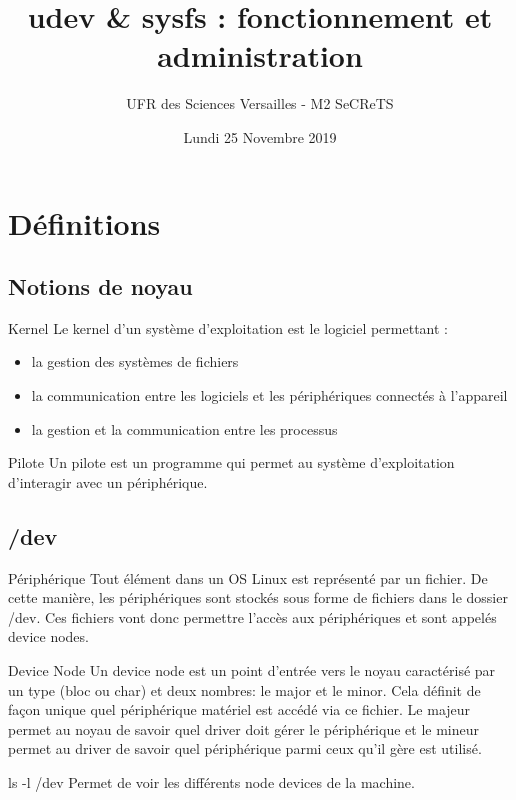 \documentclass{beamer}
\title{udev \& sysfs : fonctionnement et administration}
\author{UFR des Sciences Versailles - M2 SeCReTS}
\institute{CAUMES Clément \& DEBROUASSE Kevin \& \\ HEQUET Jonathan \& Mehdi MTALSI-MERIMI}
\date{Lundi 25 Novembre 2019}
\begin{document}
  \begin{frame}
  \titlepage
  \end{frame}

\section{Définitions}

\subsection{Notions de noyau}

 \begin{frame}
	\begin{block}{Kernel} 
	Le kernel d'un système d'exploitation est le logiciel permettant : 
	\begin{itemize}
		[circle]
		\item la gestion des systèmes de fichiers
		\item la communication entre les logiciels et les périphériques connectés à l'appareil
		\item la gestion et la communication entre les processus
	\end{itemize}
	\end{block}

	\begin{block}{Pilote} 
		Un pilote est un programme qui permet au système d'exploitation d'interagir avec un périphérique.
	\end{block}


\end{frame}

\subsection{/dev}
 \begin{frame}
	\begin{block}{Périphérique} 
		Tout élément dans un OS Linux est représenté par un fichier. De cette manière, les périphériques sont stockés sous forme de fichiers dans le dossier /dev.
		Ces fichiers vont donc permettre l’accès aux périphériques et sont appelés device nodes. 
	\end{block}
\end{frame}
\begin{frame}
    \begin{block}{Device Node}
    	Un device node est un point d’entrée vers le noyau caractérisé par un type (bloc ou char) et deux nombres: le major et le minor. Cela définit de façon unique quel périphérique matériel est accédé via ce fichier. Le majeur permet au noyau de savoir quel driver doit gérer le périphérique et le mineur permet au driver de savoir quel périphérique parmi ceux qu’il gère est utilisé. 
    \end{block}
	\begin{exampleblock}{ls -l /dev} 
		 Permet de voir les différents node devices de la machine.
	\end{exampleblock}
\end{frame}
\end{document}
